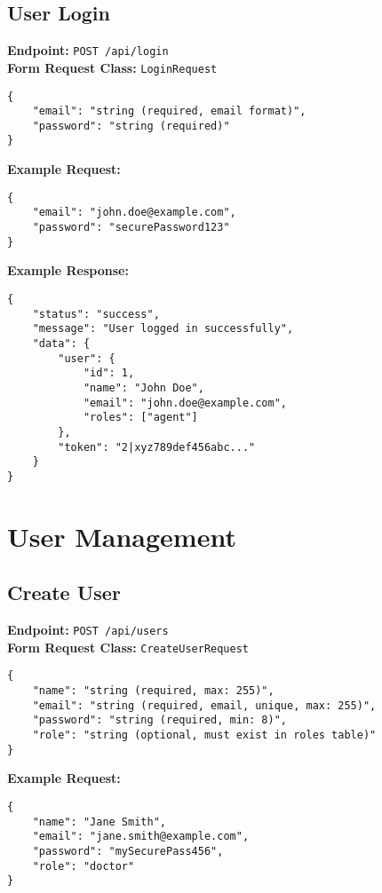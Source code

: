 \documentclass[12pt,a4paper]{article}
\begin{document}
\subsection{User Login}
\textbf{Endpoint:} \texttt{POST /api/login}\\
\textbf{Form Request Class:} \texttt{LoginRequest}

\begin{lstlisting}[caption=Login Request Body]
{
    "email": "string (required, email format)",
    "password": "string (required)"
}
\end{lstlisting}

\textbf{Example Request:}
\begin{lstlisting}[caption=Login Example Request]
{
    "email": "john.doe@example.com",
    "password": "securePassword123"
}
\end{lstlisting}

\textbf{Example Response:}
\begin{lstlisting}[caption=Login Example Response]
{
    "status": "success",
    "message": "User logged in successfully",
    "data": {
        "user": {
            "id": 1,
            "name": "John Doe",
            "email": "john.doe@example.com",
            "roles": ["agent"]
        },
        "token": "2|xyz789def456abc..."
    }
}
\end{lstlisting}

\section{User Management}

\subsection{Create User}
\textbf{Endpoint:} \texttt{POST /api/users}\\
\textbf{Form Request Class:} \texttt{CreateUserRequest}

\begin{lstlisting}[caption=Create User Request Body]
{
    "name": "string (required, max: 255)",
    "email": "string (required, email, unique, max: 255)",
    "password": "string (required, min: 8)",
    "role": "string (optional, must exist in roles table)"
}
\end{lstlisting}

\textbf{Example Request:}
\begin{lstlisting}[caption=Create User Example Request]
{
    "name": "Jane Smith",
    "email": "jane.smith@example.com",
    "password": "mySecurePass456",
    "role": "doctor"
}
\end{lstlisting}
\end{document}
